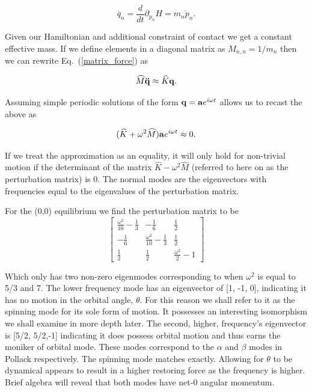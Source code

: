 \documentclass[prbg,preprint]{revtex4-1}
\newcommand{\cvec}[1]{{\rm{\bf{#1}}}}
\begin{document}
\begin{equation}
	\ddot{ q_n } =\frac{d}{dt} \partial_{p_n} H = m_n \dot p_n.
\end{equation}

Given our Hamiltonian and additional constraint of contact we get a constant effective mass. If we define elements in a diagonal matrix as 
$M_{n,n}=1/m_n$
then we can rewrite Eq.~(\ref{matrix_force}) as 

\begin{equation}
	\widehat M \cvec{ \ddot{ q }} \approx \widehat K \cvec q.
\end{equation}

Assuming simple periodic solutions of the form $\cvec q = \cvec a e^{i\omega t}$ allows us to recast the above as

\begin{equation}
	( 
	\widehat K + \omega^2 \widehat M
	)  \cvec{ a}e^{i\omega t} \approx 0 .
\end{equation}

If we treat the approximation as an equality, it will only hold for non-trivial motion if the determinant of the matrix $\widehat K - \omega^2 \widehat M$ (referred to here on as the perturbation matrix) is 0. The normal modes are the eigenvectors with frequencies equal to the eigenvalues of the perturbation matrix.

For the (0,0) equilibrium we find the perturbation matrix to be
\begin{equation}
	\left[\begin{matrix}
	\frac{\omega^{2}}{10} - \frac{1}{3} & - \frac{1}{6} & \frac{1}{2}\\
	- \frac{1}{6} & \frac{\omega^{2}}{10} - \frac{1}{3} & \frac{1}{2}\\
	\frac{1}{2} & \frac{1}{2} & \frac{\omega^{2}}{2} - 1
	\end{matrix}\right]
\end{equation}

Which only has two non-zero eigenmodes corresponding to when $\omega^2$ is equal to 5/3 and 7. The lower frequency mode has an eigenvector of [1, -1, 0], indicating it has no motion in the orbital angle, $\theta$. For this reason we shall refer to it as the spinning mode for its sole form of motion. It possesses an interesting isomorphism we shall examine in more depth later. The second, higher, frequency's eigenvector is [5/2, 5/2,-1] indicating it does possess orbital motion and thus earns the moniker of orbital mode. These modes correspond to the $\alpha$ and $\beta$ modes in Pollack \cite{doi:10.1139/p96-151} respectively. The spinning mode matches exactly. 
Allowing for $\theta$ to be dynamical appears to result in a higher restoring force as the frequency is higher.
Brief algebra will reveal that both modes have net-0 angular momentum.
\end{document}
